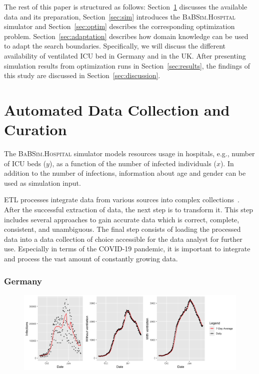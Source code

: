 \documentclass[conference]{IEEEtran}
\newcommand{\babsimhospital}{\textsc{BaBSim.Hospital}\xspace}
\begin{document}
The rest of this paper is structured as follows: 
Section~\ref{sec:data} discusses the available data and its preparation,
Section~\ref{sec:sim} introduces the \babsimhospital simulator and 
Section~\ref{sec:optim} describes the corresponding optimization problem. 
Section~\ref{sec:adaptation} describes how domain knowledge can be used to adapt the search boundaries.
Specifically, we will discuss the different availability of ventilated \gls{ICU} bed in Germany and in the UK.
After presenting simulation results from optimization runs in  Section~\ref{sec:results}, the findings of this study are discussed in Section~\ref{sec:discussion}.

\section{Automated Data Collection and Curation}\label{sec:data}
The \babsimhospital simulator models 
 resources usage in hospitals, e.g., number of \gls{ICU} beds ($y$), as a function 
of the number of infected individuals ($x$).
In addition to the number of infections, information about age and gender can be used as simulation input.

\gls{ETL} processes integrate data from various sources into complex collections~\citep{ELSAPPAGH201191}. 
After the successful extraction of data, the next step is to transform it. 
This step includes several approaches to gain accurate data which is correct, complete, consistent, and unambiguous.  
The final step consists of loading the processed data into a data collection of choice accessible for the data analyst for further use.
Especially in terms of the COVID-19 pandemic, it is important to integrate and process the vast amount of constantly growing data. 

\subsubsection{Germany}


\begin{figure}
    \centering
    \includegraphics[width=0.97\linewidth]{rkiDiviData.png}
    \caption{}
\label{fig:rki}
\end{figure}
\end{document}
